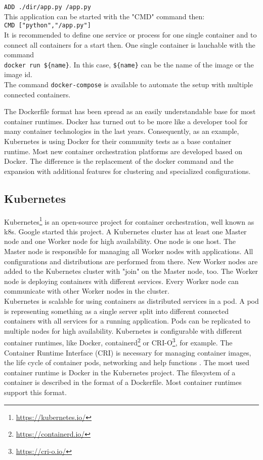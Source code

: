 \lstinline!ADD ./dir/app.py /app.py! \\
This application can be started with the "CMD" command then: \\
\lstinline!CMD ["python","/app.py"]! \\
It is recommended to define one service or process for one single container and to connect all containers for a start then. One single container is lauchable with the command \\
\lstinline!docker run ${name}!. In this case, \lstinline!${name}! can be the name of the image or the image id. \\
The command \lstinline!docker-compose! is available to automate the setup with multiple connected containers. 

The Dockerfile format has been spread as an easily understandable base for most container runtimes. 
Docker has turned out to be more like a developer tool for many container technologies in the last years. 
Consequently, as an example, Kubernetes is using Docker for their community tests as a base container runtime.
Most new container orchestration platforms are developed based on Docker. The difference is the replacement of the docker command and the expansion with additional features for clustering and specialized configurations.

\subsection{Kubernetes}

Kubernetes\footnote{\url{https://kubernetes.io/}} is an open-source project for container orchestration, well known as k8s. Google started this project. A Kubernetes cluster has at least one Master node and one Worker node for high availability. One node is one host. The Master node is responsible for managing all Worker nodes with applications. All configurations and distributions are performed from there. New Worker nodes are added to the Kubernetes cluster with "join" on the Master node, too. The Worker node is deploying containers with different services. Every Worker node can communicate with other Worker nodes in the cluster. \\
Kubernetes is scalable for using containers as distributed services in a pod. A pod is representing something as a single server split into different connected containers with all services for a running application. Pods can be replicated to multiple nodes for high availability. Kubernetes is configurable with different container runtimes, like Docker, containerd\footnote{\url{https://containerd.io/}} or CRI-O\footnote{\url{https://cri-o.io/}}, for example. The Container Runtime Interface (CRI) is necessary for managing container images, the life cycle of container pods, networking and help functions \cite[~p.16]{Scholl2019}. The most used container runtime is Docker in the Kubernetes project. The filesystem of a container is described in the format of a Dockerfile. Most container runtimes support this format.


